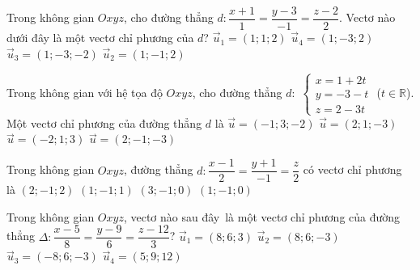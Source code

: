 \begin{ex}%
	Trong không gian  $Oxyz$, cho đường thẳng $d\colon \dfrac{x+1}{1} = \dfrac{y - 3}{-1} = \dfrac{z - 2}{2}$. Vectơ nào dưới đây là một vectơ chỉ phương của $d$?
	\choice 
		{$\overrightarrow{u}_1 =  (1;1;2)$}
		{$\overrightarrow{u}_4 = (1;-3;2)$} 
		{$\overrightarrow{u}_3  = (1;-3;-2)$}
		{\True $\overrightarrow{u}_2 =  (1;-1;2)$}
\end{ex}

\begin{ex}%
	Trong không gian với  hệ tọa độ $Oxyz$, cho đường thẳng $d \colon$
	$\begin{cases}
	x = 1+2t \\ 
	 y = -3 - t \\
	z = 2 -  3t
\end{cases}$ ($t \in \mathbb{R}$).
 Một vectơ chỉ phương của đường thẳng $d$ là
 \choice
	{$\overrightarrow{u} = (-1; 3; -2)$} 
	 {$\overrightarrow{u} = (2; 1; -3)$}
	 {$\overrightarrow{u} = (-2; 1; 3)$}
	 {\True $\overrightarrow{u} = (2; -1; -3)$}
\end{ex}

\begin{ex}%
	Trong không gian $Oxyz$, đường thẳng $d\colon \dfrac{x-1}{2}=\dfrac{y+1}{-1}=\dfrac{z}{2}$ có vectơ chỉ phương  là
	 \choice
		{\True  $(2;-1;2)$}
		 {$(1;-1;1)$}
		 {$(3;-1;0)$}
		 {$(1;-1;0)$}
\end{ex}

\begin{ex}%
	Trong không gian $Oxyz$, vectơ nào  sau đây~là một vectơ chỉ phương của đường thẳng $\Delta\colon \dfrac{x-5}{8}=\dfrac{y-9}{6}=\dfrac{z-12}{3}$?
	\choice 
		{\True $\overrightarrow{u}_1=(8;  6; 3)$}
		{$\overrightarrow{u}_2=(8; 6;-3)$} 
		{$\overrightarrow{u}_3=(-8;  6;-3)$}
		{$\overrightarrow{u}_4=(5; 9;  12)$}
\end{ex}

